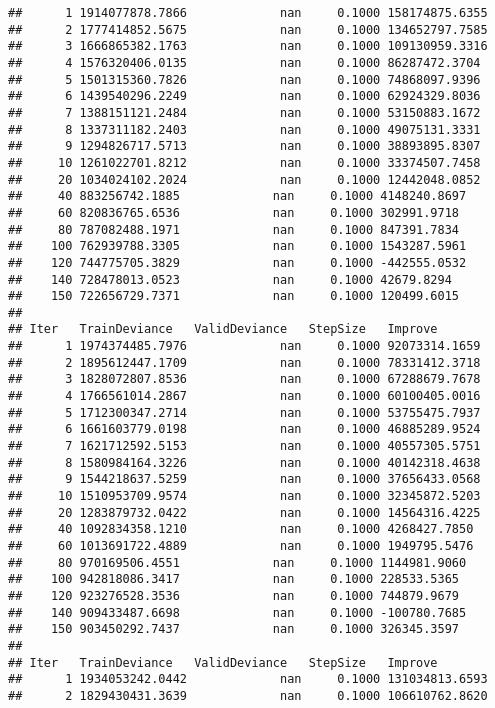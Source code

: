 \documentclass[
]{article}
\begin{document}
\begin{verbatim}
##      1 1914077878.7866             nan     0.1000 158174875.6355
##      2 1777414852.5675             nan     0.1000 134652797.7585
##      3 1666865382.1763             nan     0.1000 109130959.3316
##      4 1576320406.0135             nan     0.1000 86287472.3704
##      5 1501315360.7826             nan     0.1000 74868097.9396
##      6 1439540296.2249             nan     0.1000 62924329.8036
##      7 1388151121.2484             nan     0.1000 53150883.1672
##      8 1337311182.2403             nan     0.1000 49075131.3331
##      9 1294826717.5713             nan     0.1000 38893895.8307
##     10 1261022701.8212             nan     0.1000 33374507.7458
##     20 1034024102.2024             nan     0.1000 12442048.0852
##     40 883256742.1885             nan     0.1000 4148240.8697
##     60 820836765.6536             nan     0.1000 302991.9718
##     80 787082488.1971             nan     0.1000 847391.7834
##    100 762939788.3305             nan     0.1000 1543287.5961
##    120 744775705.3829             nan     0.1000 -442555.0532
##    140 728478013.0523             nan     0.1000 42679.8294
##    150 722656729.7371             nan     0.1000 120499.6015
## 
## Iter   TrainDeviance   ValidDeviance   StepSize   Improve
##      1 1974374485.7976             nan     0.1000 92073314.1659
##      2 1895612447.1709             nan     0.1000 78331412.3718
##      3 1828072807.8536             nan     0.1000 67288679.7678
##      4 1766561014.2867             nan     0.1000 60100405.0016
##      5 1712300347.2714             nan     0.1000 53755475.7937
##      6 1661603779.0198             nan     0.1000 46885289.9524
##      7 1621712592.5153             nan     0.1000 40557305.5751
##      8 1580984164.3226             nan     0.1000 40142318.4638
##      9 1544218637.5259             nan     0.1000 37656433.0568
##     10 1510953709.9574             nan     0.1000 32345872.5203
##     20 1283879732.0422             nan     0.1000 14564316.4225
##     40 1092834358.1210             nan     0.1000 4268427.7850
##     60 1013691722.4889             nan     0.1000 1949795.5476
##     80 970169506.4551             nan     0.1000 1144981.9060
##    100 942818086.3417             nan     0.1000 228533.5365
##    120 923276528.3536             nan     0.1000 744879.9679
##    140 909433487.6698             nan     0.1000 -100780.7685
##    150 903450292.7437             nan     0.1000 326345.3597
## 
## Iter   TrainDeviance   ValidDeviance   StepSize   Improve
##      1 1934053242.0442             nan     0.1000 131034813.6593
##      2 1829430431.3639             nan     0.1000 106610762.8620

\end{verbatim}
\end{document}

